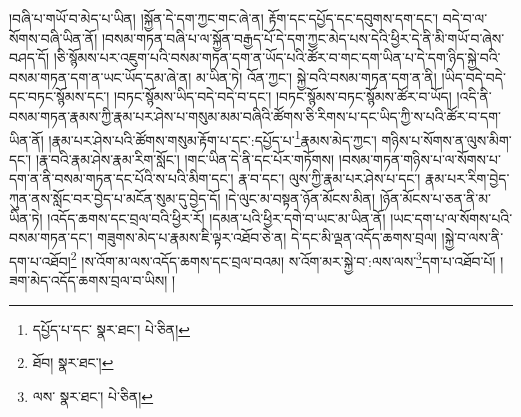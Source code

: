 །བཞི་པ་གཡོ་བ་མེད་པ་ཡིན། །སྐྱོན་དེ་དག་ཀྱང་གང་ཞེ་ན། རྟོག་དང་དཔྱོད་དང་དབུགས་དག་དང་། བདེ་བ་ལ་སོགས་བཞི་ཡིན་ནོ། །བསམ་གཏན་བཞི་པ་ལ་སྐྱོན་བརྒྱད་པོ་དེ་དག་ཀྱང་མེད་པས་དེའི་ཕྱིར་དེ་ནི་མི་གཡོ་བ་ཞེས་བཤད་དོ། །ཅི་སྙོམས་པར་འཇུག་པའི་བསམ་གཏན་དག་ན་ཡོད་པའི་ཚོར་བ་གང་དག་ཡིན་པ་དེ་དག་ཉིད་སྐྱེ་བའི་བསམ་གཏན་དག་ན་ཡང་ཡོད་དམ་ཞེ་ན། མ་ཡིན་ཏེ། འོན་ཀྱང་། སྐྱེ་བའི་བསམ་གཏན་དག་ན་ནི། །ཡིད་བདེ་བདེ་དང་བཏང་སྙོམས་དང་། །བཏང་སྙོམས་ཡིད་བདེ་བདེ་བ་དང་། །བཏང་སྙོམས་བཏང་སྙོམས་ཚོར་བ་ཡོད། །འདི་ནི་བསམ་གཏན་རྣམས་ཀྱི་རྣམ་པར་ཤེས་པ་གསུམ་མམ་བཞིའི་ཚོགས་ཅི་རིགས་པ་དང་ཡིད་ཀྱི་ས་པའི་ཚོར་བ་དག་ཡིན་ནོ། །རྣམ་པར་ཤེས་པའི་ཚོགས་གསུམ་རྟོག་པ་དང་:དཔྱོད་པ་\footnote{དཔྱོད་པ་དང་  སྣར་ཐང་།  པེ་ཅིན། }རྣམས་མེད་ཀྱང་། གཉིས་པ་སོགས་ན་ལུས་མིག་དང་། །རྣ་བའི་རྣམ་ཤེས་རྣམ་རིག་སློང་། །གང་ཡིན་དེ་ནི་དང་པོར་གཏོགས། །བསམ་གཏན་གཉིས་པ་ལ་སོགས་པ་དག་ན་ནི་བསམ་གཏན་དང་པོའི་ས་པའི་མིག་དང་། རྣ་བ་དང་། ལུས་ཀྱི་རྣམ་པར་ཤེས་པ་དང་། རྣམ་པར་རིག་བྱེད་ཀུན་ནས་སློང་བར་བྱེད་པ་མངོན་སུམ་དུ་བྱེད་དོ། །དེ་ལུང་མ་བསྟན་ཉོན་མོངས་མིན། །ཉོན་མོངས་པ་ཅན་ནི་མ་ཡིན་ཏེ། །འདོད་ཆགས་དང་བྲལ་བའི་ཕྱིར་རོ། །དམན་པའི་ཕྱིར་དགེ་བ་ཡང་མ་ཡིན་ནོ། །ཡང་དག་པ་ལ་སོགས་པའི་བསམ་གཏན་དང་། གཟུགས་མེད་པ་རྣམས་ཇི་ལྟར་འཐོབ་ཅེ་ན། དེ་དང་མི་ལྡན་འདོད་ཆགས་བྲལ། །སྐྱེ་བ་ལས་ནི་དག་པ་འཐོབ།\footnote{ཐོབ།  སྣར་ཐང་། } །ས་འོག་མ་ལས་འདོད་ཆགས་དང་བྲལ་བའམ། ས་འོག་མར་སྐྱེ་བ་:ལས་ལས་\footnote{ལས་  སྣར་ཐང་།  པེ་ཅིན། }དག་པ་འཐོབ་པོ། །ཟག་མེད་འདོད་ཆགས་བྲལ་བ་ཡིས། །
